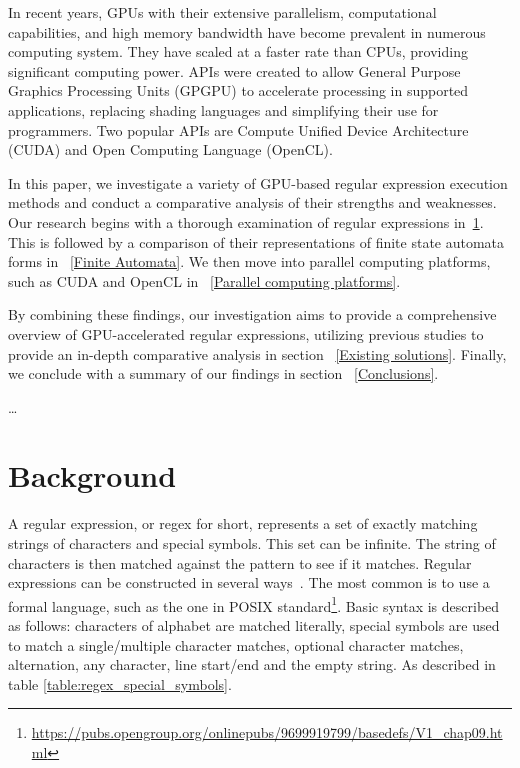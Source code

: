 \documentclass[10pt,onecolumn,twoside,english,a4paper]{article}
\begin{document}
In recent years, GPUs with their extensive parallelism, computational capabilities, and high memory bandwidth have become prevalent in numerous computing system. They have scaled at a faster rate than CPUs, providing significant computing power\cite{sun2019summarizing,Liu:Asynchronous}. APIs were created to allow General Purpose Graphics Processing Units (GPGPU) to accelerate processing in supported applications, replacing shading languages and simplifying their use for programmers. Two popular APIs are Compute Unified Device Architecture (CUDA) and Open Computing Language (OpenCL)\cite{Fang:Comparison-cuda-opencl}.

In this paper, we investigate a variety of GPU-based regular expression execution methods and conduct a comparative analysis of their strengths and weaknesses. Our research begins with a thorough examination of regular expressions in~\ref{Background}. This is followed by a comparison of their representations of finite state automata forms in ~\ref{Finite Automata}. We then move into parallel computing platforms, such as CUDA and OpenCL in ~\ref{Parallel computing platforms}.

By combining these findings, our investigation aims to provide a comprehensive overview of GPU-accelerated regular expressions, utilizing previous studies to provide an in-depth comparative analysis in section ~\ref{Existing solutions}. Finally, we conclude with a summary of our findings in section ~\ref{Conclusions}.

\ldots

\section{Background} \label{Background}
A regular expression, or regex for short, represents a set of exactly matching strings of characters and special symbols. This set can be infinite. The string of characters is then matched against the pattern to see if it matches. Regular expressions can be constructed in several ways~\cite{wang2014techniques}. The most common is to use a formal language, such as the one in POSIX standard\footnote{\url{https://pubs.opengroup.org/onlinepubs/9699919799/basedefs/V1_chap09.html}}.
Basic syntax is described as follows: characters of alphabet are matched literally, special symbols are used to match a single/multiple character matches, optional character matches, alternation, any character, line start/end and the empty string. As described in table \ref{table:regex_special_symbols}.
\end{document}
